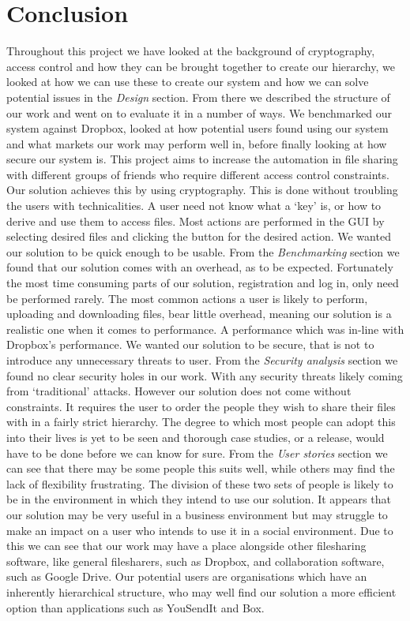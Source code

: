 \documentclass[12pt, titlepage]{article}
\begin{document}
\section{Conclusion}
Throughout this project we have looked at the background of cryptography, access control and how they can be brought together to create our hierarchy, we looked at how we can use these to create our system and how we can solve potential issues in the \textit{Design} section. From there we described the structure of our work and went on to evaluate it in a number of ways. We benchmarked our system against Dropbox, looked at how potential users found using our system and what markets our work may perform well in, before finally looking at how secure our system is.
\newline \indent This project aims to increase the automation in file sharing with different groups of friends who require different access control constraints. Our solution achieves this by using cryptography. This is done without troubling the users with technicalities. A user need not know what a `key' is, or how to derive and use them to access files. Most actions are performed in the GUI by selecting desired files and clicking the button for the desired action.
\newline \indent We wanted our solution to be quick enough to be usable. From the \textit{Benchmarking} section we found that our solution comes with an overhead, as to be expected. Fortunately the most time consuming parts of our solution, registration and log in, only need be performed rarely. The most common actions a user is likely to perform, uploading and downloading files, bear little overhead, meaning our solution is a realistic one when it comes to performance. A performance which was in-line with Dropbox's performance.
\newline \indent We wanted our solution to be secure, that is not to introduce any unnecessary threats to user. From the \textit{Security analysis} section we found no clear security holes in our work. With any security threats likely coming from `traditional' attacks.
\newline \indent However our solution does not come without constraints. It requires the user to order the people they wish to share their files with in a fairly strict hierarchy. The degree to which most people can adopt this into their lives is yet to be seen and thorough case studies, or a release, would have to be done before we can know for sure. From the \textit{User stories} section we can see that there may be some people this suits well, while others may find the lack of flexibility frustrating. The division of these two sets of people is likely to be in the environment in which they intend to use our solution. It appears that our solution may be very useful in a business environment but may struggle to make an impact on a user who intends to use it in a social environment. Due to this we can see that our work may have a place alongside other filesharing software, like general filesharers, such as Dropbox, and collaboration software, such as Google Drive. Our potential users are organisations which have an inherently hierarchical structure, who may well find our solution a more efficient option than applications such as YouSendIt and Box.
\end{document}

